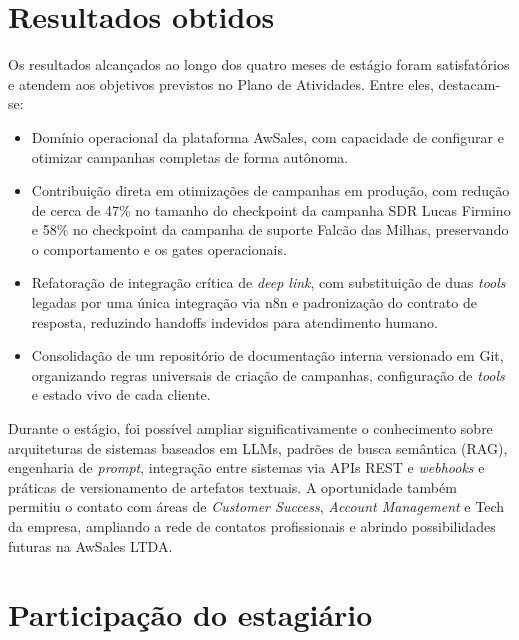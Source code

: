 \documentclass[12pt,a4paper,oneside]{article}
\begin{document}
\section{Resultados obtidos}

Os resultados alcançados ao longo dos quatro meses de estágio foram satisfatórios e atendem aos objetivos previstos no Plano de Atividades. Entre eles, destacam-se:

\begin{itemize}[leftmargin=2em]
  \item Domínio operacional da plataforma AwSales, com capacidade de configurar e otimizar campanhas completas de forma autônoma.
  \item Contribuição direta em otimizações de campanhas em produção, com redução de cerca de 47\% no tamanho do checkpoint da campanha SDR Lucas Firmino e 58\% no checkpoint da campanha de suporte Falcão das Milhas, preservando o comportamento e os gates operacionais.
  \item Refatoração de integração crítica de \textit{deep link}, com substituição de duas \textit{tools} legadas por uma única integração via n8n e padronização do contrato de resposta, reduzindo handoffs indevidos para atendimento humano.
  \item Consolidação de um repositório de documentação interna versionado em Git, organizando regras universais de criação de campanhas, configuração de \textit{tools} e estado vivo de cada cliente.
\end{itemize}

Durante o estágio, foi possível ampliar significativamente o conhecimento sobre arquiteturas de sistemas baseados em LLMs, padrões de busca semântica (RAG), engenharia de \textit{prompt}, integração entre sistemas via APIs REST e \textit{webhooks} e práticas de versionamento de artefatos textuais. A oportunidade também permitiu o contato com áreas de \textit{Customer Success}, \textit{Account Management} e Tech da empresa, ampliando a rede de contatos profissionais e abrindo possibilidades futuras na AwSales LTDA.

\section{Participação do estagiário}
\end{document}
